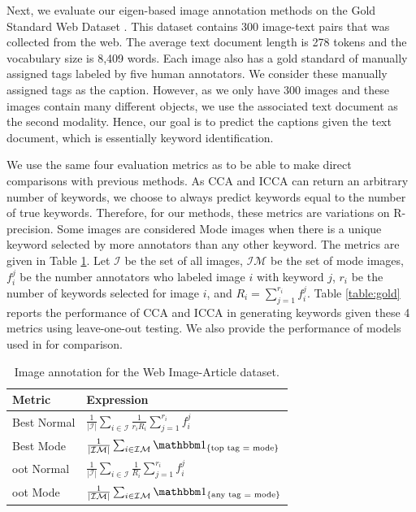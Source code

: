 Next, we evaluate our eigen-based image annotation methods on the Gold Standard Web
Dataset \cite{leong2010text}. This dataset contains 300 image-text pairs that was
collected from the web. The average text document length is 278 tokens and the vocabulary
size is 8,409 words. Each image also has a gold standard of manually assigned tags labeled
by five human annotators. We consider these manually assigned tags as the
caption. However, as we only have 300 images and these images contain many different
objects, we use the associated text document  as the second
modality. Hence, our goal is to predict the captions given the text document, which is
essentially keyword identification.

We use the same four evaluation metrics as \cite{leong2010text} to be able to make direct
comparisons with previous methods. As CCA and ICCA can return an arbitrary number of
keywords, we choose to always predict keywords equal to the number of true
keywords. Therefore, for our methods, these metrics are variations on R-precision. Some
images are considered Mode images when there is a unique keyword selected by more
annotators than any other keyword. The metrics are given in Table
\ref{table:gold_metrics}. Let $\mathcal{I}$ be the set of all images, $\mathcal{IM}$ be
the set of mode images, $f_i^j$ be the number annotators who labeled image $i$ with keyword
$j$, $r_i$ be the number of keywords selected for image $i$, and $R_i=\sum_{j=1}^{r_i}f_i^j$. Table \ref{table:gold}
reports the performance of CCA and ICCA in generating keywords given these 4 metrics using
leave-one-out testing. We also provide the performance of models used in
\cite{leong2010text} for comparison.

\begin{table}[t]
  \centering
  \begin{tabular}{l|l}
    Metric & Expression\\
    \midrule
    Best Normal & $\frac{1}{|\mathcal{I}|}\sum_{i\in\mathcal{I}}\frac{1}{r_iR_i}\sum_{j=1}^{r_i}f_i^j$\\
    Best Mode & $\frac{1}{|\mathcal{IM}|}\sum_{i\in\mathcal{IM}}\indicator_{\left\{\text{top tag = mode}\right\}}$\\
    oot Normal & $\frac{1}{|\mathcal{I}|}\sum_{i\in\mathcal{I}}\frac{1}{R_i}\sum_{j=1}^{r_i}f_i^j$\\
    oot Mode & $\frac{1}{|\mathcal{IM}|}\sum_{i\in\mathcal{IM}}\indicator_{\left\{\text{any tag = mode}\right\}}$\\
    \bottomrule
  \end{tabular}
  \caption{Image annotation for the Web Image-Article dataset.}
  \label{table:gold_metrics}
  \vspace{-0.1in}
\end{table}


